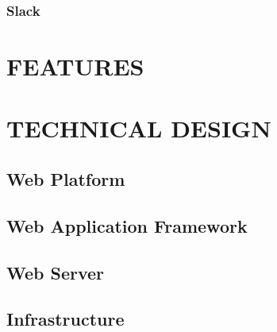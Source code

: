 \documentclass[letterpaper,12pt,2p]{elsarticle}
\begin{document}
\subsubsection{ Slack}
\label{subsec1}




\newpage 

\section{ FEATURES}%
\label{FEA}%








\newpage 

\section{ TECHNICAL DESIGN}%
\label{TD}%



\subsection{ Web Platform}
\label{subsec1}





\subsection{ Web Application Framework}
\label{subsec1}





\subsection{ Web Server}
\label{subsec1}





\subsection{ Infrastructure}
\label{subsec1}
\end{document}
